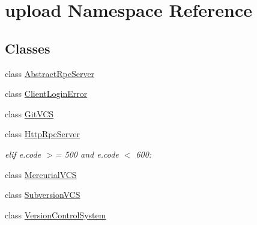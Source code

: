 \hypertarget{namespaceupload}{}\section{upload Namespace Reference}
\label{namespaceupload}
\subsection*{Classes}
\begin{DoxyCompactItemize}
\item 
class \mbox{\hyperlink{classupload_1_1AbstractRpcServer}{Abstract\+Rpc\+Server}}
\item 
class \mbox{\hyperlink{classupload_1_1ClientLoginError}{Client\+Login\+Error}}
\item 
class \mbox{\hyperlink{classupload_1_1GitVCS}{Git\+V\+CS}}
\item 
class \mbox{\hyperlink{classupload_1_1HttpRpcServer}{Http\+Rpc\+Server}}
\begin{DoxyCompactList}\small\item\em elif e.\+code $>$= 500 and e.\+code $<$ 600\+: \end{DoxyCompactList}\item 
class \mbox{\hyperlink{classupload_1_1MercurialVCS}{Mercurial\+V\+CS}}
\item 
class \mbox{\hyperlink{classupload_1_1SubversionVCS}{Subversion\+V\+CS}}
\item 
class \mbox{\hyperlink{classupload_1_1VersionControlSystem}{Version\+Control\+System}}
\end{DoxyCompactItemize}
